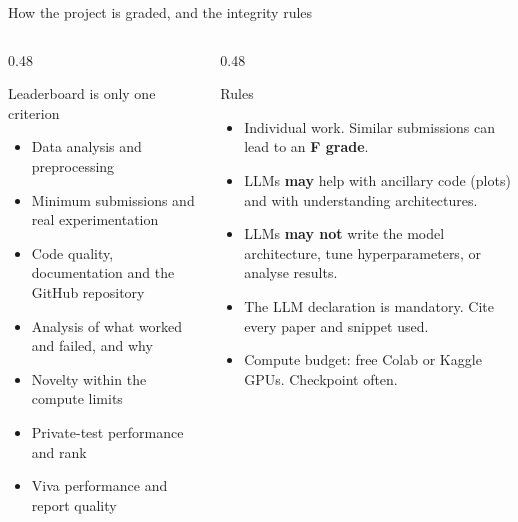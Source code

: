 \documentclass[aspectratio=169,11pt]{beamer}
\begin{document}
\begin{frame}{How the project is graded, and the integrity rules}
  \begin{columns}[T]
    \begin{column}{0.48\textwidth}
      \begin{block}{Leaderboard is only one criterion}
        \small
        \begin{itemize}
          \item Data analysis and preprocessing
          \item Minimum submissions and real experimentation
          \item Code quality, documentation and the GitHub repository
          \item Analysis of what worked and failed, and why
          \item Novelty within the compute limits
          \item Private-test performance and rank
          \item Viva performance and report quality
        \end{itemize}
      \end{block}
    \end{column}
    \begin{column}{0.48\textwidth}
      \begin{alertblock}{Rules}
        \small
        \begin{itemize}
          \item Individual work. Similar submissions can lead to an \textbf{F grade}.
          \item LLMs \textbf{may} help with ancillary code (plots) and with understanding architectures.
          \item LLMs \textbf{may not} write the model architecture, tune hyperparameters, or analyse results.
          \item The LLM declaration is mandatory. Cite every paper and snippet used.
          \item Compute budget: free Colab or Kaggle GPUs. Checkpoint often.
        \end{itemize}
      \end{alertblock}
    \end{column}
  \end{columns}
\end{frame}
\end{document}
